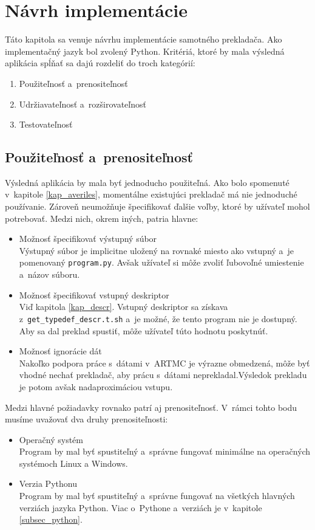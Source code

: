 \chapter{Návrh implementácie}
\label{kap_imp}
Táto kapitola sa venuje návrhu implementácie samotného prekladača.
Ako implementačný jazyk bol zvolený Python. Kritériá, ktoré by mala výsledná
aplikácia spĺňať sa dajú rozdeliť do troch kategórií:
\begin{enumerate}
    \item Použiteľnosť a~prenositeľnosť
    \item Udržiavateľnosť a~rozširovateľnosť
    \item Testovateľnosť
\end{enumerate}

\section{Použiteľnosť a~prenositeľnosť}
Výsledná aplikácia by mala byť jednoducho použiteľná. Ako bolo spomenuté
v~kapitole \ref{kap_averiles}, momentálne existujúci prekladač má nie jednoduché používanie. Zároveň
neumožňuje špecifikovať ďalšie voľby, ktoré by užívateľ mohol potrebovať. Medzi nich, okrem iných, patria hlavne:
\begin{itemize}
    \item Možnosť špecifikovať výstupný súbor\\
        Výstupný súbor je implicitne uložený na rovnaké miesto ako vstupný a~je
        pomenovaný \texttt{program.py}. Avšak užívateľ si môže zvoliť ľubovoľné umiestenie
        a~názov súboru.
    \item Možnosť špecifikovať vstupný deskriptor\\
        Viď kapitola \ref{kap_descr}. Vstupný deskriptor sa získava z~\texttt{get\_typedef\_descr.t.sh} a~je
        možné, že tento program nie je dostupný. Aby sa dal preklad spustiť, môže
        užívateľ túto hodnotu poskytnúť.
    \item Možnosť ignorácie dát\\
        Nakoľko podpora práce s~dátami v~ARTMC je výrazne obmedzená, môže byť
        vhodné nechať prekladač, aby prácu s~dátami neprekladal.Výsledok prekladu je potom avšak	  nadaproximáciou vstupu.
\end{itemize}

Medzi hlavné požiadavky rovnako patrí aj prenositeľnosť. V~rámci tohto bodu
musíme uvažovať dva druhy prenositeľnosti:
\begin{itemize}
    \item Operačný systém\\
        Program by mal byť spustiteľný a~správne fungovať minimálne na operačných systémoch Linux a Windows.
    \item Verzia Pythonu\\
        Program by mal byť spustiteľný a~správne fungovať na všetkých hlavných verziách jazyka Python.
        Viac o~Pythone a~verziách je v~kapitole \ref{subsec_python}.
\end{itemize}

